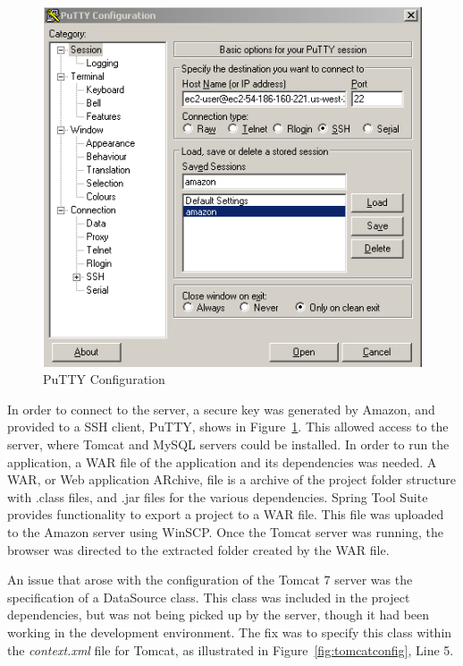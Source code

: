 \begin{figure}[H]
\begin{center}
\includegraphics[scale=0.6]{putty.png}
\end{center}
\caption{PuTTY Configuration}
\label{fig:putty}
\end{figure}

In order to connect to the server, a secure key was generated by Amazon, and provided to a SSH client, PuTTY, shows in Figure~\ref{fig:putty}. This allowed access to the server, where Tomcat and MySQL servers could be installed. In order to run the application, a WAR file of the application and its dependencies was needed. A WAR, or Web application ARchive, file is a archive of the project folder structure with .class files, and .jar files for the various dependencies.  Spring Tool Suite provides functionality to export a project to a WAR file. This file was uploaded to the Amazon server using WinSCP. Once the Tomcat server was running, the browser was directed to the extracted folder created by the WAR file.

An issue that arose with the configuration of the Tomcat 7 server was the specification of a DataSource class. This class was included in the project dependencies, but was not being picked up by the server, though it had been working in the development environment. The fix was to specify this class within the \textit{context.xml} file for Tomcat, as illustrated in Figure~\ref{fig:tomcatconfig}, Line 5. \newpage

